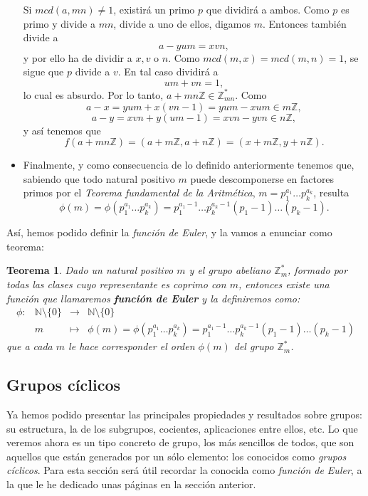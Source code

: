 \documentclass[12pt]{article}
\newtheorem{theorem}{Teorema}[section]
\begin{document}
\begin{itemize}
Si $mcd(a,mn) \neq 1$, existirá un primo $p$ que dividirá a ambos. Como $p$ es primo y divide a $mn$, divide a uno de ellos, digamos $m$. Entonces también divide a $$a - yum = xvn,$$ y por ello ha de dividir a $x, v$ o $n$. Como $mcd(m,x) = mcd(m,n)=1$, se sigue que $p$ divide a $v$. En tal caso dividirá a $$um + vn = 1,$$ lo cual es absurdo. Por lo tanto, $a + mn\mathbb{Z} \in \mathbb{Z}_{mn}^{\ast}$. Como $$a - x = yum + x(vn- 1) = yum - xum \in m\mathbb{Z},$$ $$a - y = xvn + y(um-1) = xvn -yvn \in n\mathbb{Z},$$ y así tenemos que $$f(a + mn\mathbb{Z}) = (a + m\mathbb{Z}, a + n\mathbb{Z}) = (x + m\mathbb{Z}, y + n\mathbb{Z}).$$
\item Finalmente, y como consecuencia de lo definido anteriormente tenemos que, sabiendo que todo natural positivo $m$ puede descomponerse en factores primos por el \textit{Teorema fundamental de la Aritmética}, $m = p_{1}^{a_{1}} \ldots p_{k}^{a_{k}}$, resulta $$\phi(m) = \phi(p_{1}^{a_{1}} \ldots p_{k}^{a_{k}}) = p_{1}^{a_{1}-1} \ldots p_{k}^{a_{k}-1}(p_{1}-1) \ldots (p_{k}-1).$$
\end{itemize}

Así, hemos podido definir la \textit{función de Euler}, y la vamos a enunciar como teorema:
\begin{theorem}
Dado un natural positivo $m$ y el grupo abeliano $\mathbb{Z}_{m}^{\ast}$, formado por todas las clases cuyo representante es coprimo con $m$, entonces existe una función que llamaremos \textbf{función de Euler} y la definiremos como:
$$\begin{array}{rccl}
\phi\colon &\mathbb{N}\setminus \lbrace 0 \rbrace & \longrightarrow &\mathbb{N}\setminus \lbrace 0 \rbrace\\
&m& \longmapsto &\phi (m) = \phi(p_{1}^{a_{1}} \ldots p_{k}^{a_{k}}) = p_{1}^{a_{1}-1} \ldots p_{k}^{a_{k}-1}(p_{1}-1) \ldots (p_{k}-1)
\end{array}
$$ que a cada $m$ le hace corresponder el orden $\phi(m)$ del grupo $\mathbb{Z}_{m}^{\ast}$.
\end{theorem}

\subsection{Grupos cíclicos}

Ya hemos podido presentar las principales propiedades y resultados sobre grupos: su estructura, la de los subgrupos, cocientes, aplicaciones entre ellos, etc. Lo que veremos ahora es un tipo concreto de grupo, los más sencillos de todos, que son aquellos que están generados por un sólo elemento: los conocidos como \textit{grupos cíclicos}. Para esta sección será útil recordar la conocida como \textit{función de Euler}, a la que le he dedicado unas páginas en la sección anterior.
\end{document}
